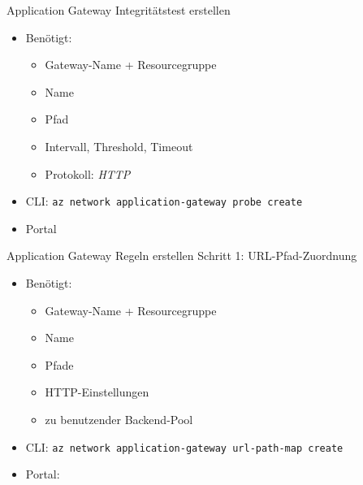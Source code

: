 \begin{flashcard}[Definition]{Application Gateway Integritätstest erstellen}
    \begin{itemize}
        \item Benötigt:
            \begin{itemize}
                \item Gateway-Name + Resourcegruppe
                \item Name
                \item Pfad
                \item Intervall, Threshold, Timeout
                \item Protokoll: \emph{HTTP}
            \end{itemize}
        \item CLI: \texttt{az network application-gateway probe create}
        \item Portal
    \end{itemize}
\end{flashcard}

\begin{flashcard}[Definition]{Application Gateway Regeln erstellen}
    Schritt 1: URL-Pfad-Zuordnung
    \begin{itemize}
        \item Benötigt:
            \begin{itemize}
                \item Gateway-Name + Resourcegruppe
                \item Name
                \item Pfade
                \item HTTP-Einstellungen
                \item zu benutzender Backend-Pool
            \end{itemize}
        \item CLI: \texttt{az network application-gateway url-path-map create}
        \item Portal:
    \end{itemize}
\end{flashcard}

